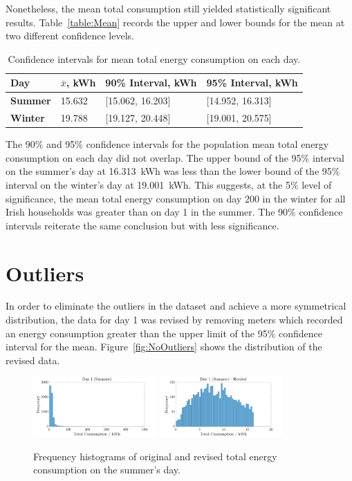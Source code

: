 \documentclass[a4paper,10pt,twocolumn]{article}
\begin{document}
Nonetheless, the mean total consumption still yielded statistically significant 
results. Table~\vref{table:Mean} records the upper and lower bounds for the 
mean at two different confidence levels.

\begin{table}[h]
    \centering
    \begin{tabular}{llll}
        \toprule
        \textbf{Day} & $\bar{x}$, \tiny{kWh} & 90\% Interval, \tiny{kWh} & 95\% 
        Interval, \tiny{kWh} \\
        \midrule
        \textbf{Summer} & 15.632 & [15.062, 16.203] & [14.952, 16.313] \\
        \textbf{Winter} & 19.788 & [19.127, 20.448] & [19.001, 20.575] \\
        \bottomrule
    \end{tabular}
    \caption{Confidence intervals for mean total energy consumption on each 
    day.}
    \label{table:Mean}
\end{table}

The 90\% and 95\% confidence intervals for the population mean total energy 
consumption on each day did not overlap. The upper bound of the 95\% interval 
on the summer's day at 16.313~kWh was less than the lower bound of the 95\% 
interval on the winter's day at 19.001~kWh. This suggests, at the 5\% level of 
significance, the mean total energy consumption on day 200 in the winter for 
all Irish households was greater than on day 1 in the summer. The 90\% 
confidence intervals reiterate the same conclusion but with less significance.

\section{Outliers}

In order to eliminate the outliers in the dataset and achieve a more 
symmetrical distribution, the data for day 1 was revised by removing meters 
which recorded an energy consumption greater than the upper limit of the 95\% 
confidence interval for the mean. Figure~\vref{fig:NoOutliers} shows the 
distribution of the revised data.

\begin{figure}[h]
    \centering
    \includegraphics[width=0.42\textwidth]{Day1}
    \includegraphics[width=0.42\textwidth]{Day1Revised}
    \caption{Frequency histograms of original and revised total energy 
    consumption on the summer's day.}
    \label{fig:NoOutliers}
\end{figure}
\end{document}
